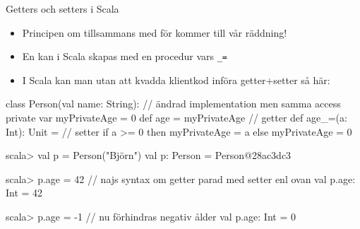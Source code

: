 \begin{Slide}{Getters och setters i Scala}\SlideFontSmall
\setlength{\leftmargini}{0pt}
\begin{itemize}
\item Principen om  tillsammans med  för  kommer till vår räddning!

\item
En  kan i Scala skapas med en procedur vars  \texttt{\_=}
\pause
\item I Scala kan man utan att kvadda klientkod införa getter+setter så här:
\end{itemize}
\begin{Code}
class Person(val name: String): // ändrad implementation men samma access
  private var myPrivateAge = 0
  def age = myPrivateAge         // getter
  def age_=(a: Int): Unit =      // setter
    if a >= 0 then myPrivateAge = a else myPrivateAge = 0
\end{Code}
\pause\vspace{-0.5em}
\begin{REPL}
scala> val p = Person("Björn")
val p: Person = Person@28ac3dc3

scala> p.age = 42      // najs syntax om getter parad med setter enl ovan
val p.age: Int = 42

scala> p.age = -1      // nu förhindras negativ ålder
val p.age: Int = 0
\end{REPL}
\end{Slide}


